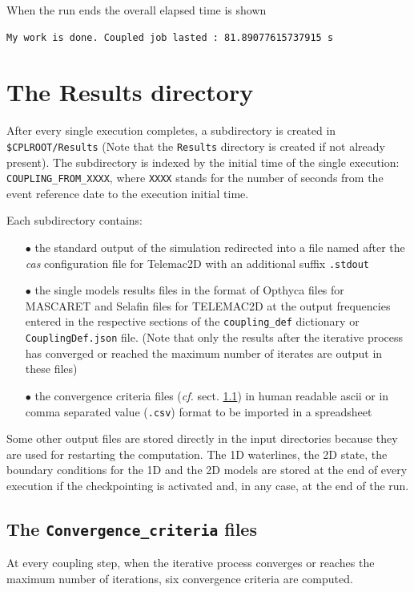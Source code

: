 When the run ends the overall elapsed time is shown
\begin{verbatim}
My work is done. Coupled job lasted : 81.89077615737915 s
\end{verbatim}

\chapter{The Results directory}
After every single execution completes, a subdirectory is created in
\texttt{\$CPLROOT/Results} (Note that the \texttt{Results} directory
is created if not already present). The subdirectory is
indexed by the initial time of the single execution:
\texttt{COUPLING\_FROM\_XXXX}, where \texttt{XXXX} stands for the
number of seconds from the event reference date to the execution
initial time.
\newline

Each subdirectory contains:
\begin{itemize}
\item[$\bullet$] the standard output of the simulation redirected into
  a file named after the {\em cas} configuration file for
  Telemac2D with an additional suffix \texttt{.stdout}
\item[$\bullet$] the single models results files in the
format of Opthyca files for MASCARET and Selafin files for TELEMAC2D
at the output frequencies entered in the respective sections of the
\texttt{coupling\_def} dictionary or
\texttt{CouplingDef.json} file. (Note that only the results after
the iterative process has converged or reached the maximum number of
iterates are output in these files)
\item[$\bullet$] the convergence criteria files ({\em cf.}
  sect. \ref{res:CONVCRIT}) in human readable ascii or in comma
  separated value (\texttt{.csv}) format to be imported in a spreadsheet
\end{itemize}

Some other output files are stored directly in the input directories
because they are used for restarting the computation. The 1D
waterlines, the 2D state, the boundary conditions for the 1D and the
2D models are stored at the end of every execution if the
checkpointing is activated and, in any case, at the end of the run.

\section{The \texttt{Convergence\_criteria} files}\label{res:CONVCRIT}
At every coupling step, when the iterative process converges or
reaches the maximum number of iterations, six convergence criteria are
computed.


